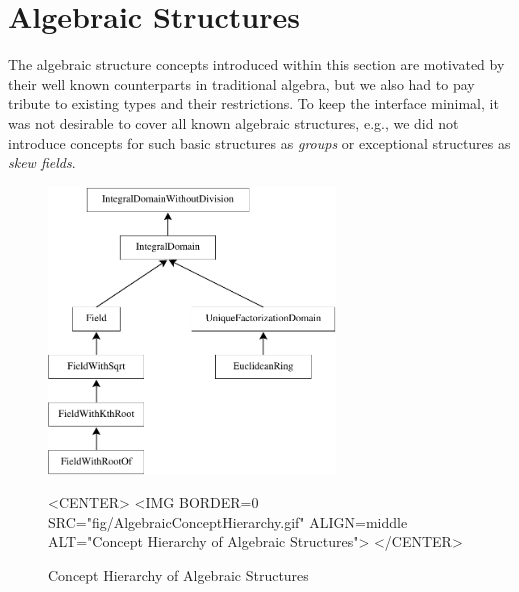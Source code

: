 
\section{Algebraic Structures}


The algebraic structure concepts introduced within this section are 
motivated by their well known counterparts in traditional algebra, 
but we also had to pay tribute to existing types and their restrictions. 
To keep the interface minimal,
it was not desirable to cover all known algebraic structures, 
e.g., we did not introduce concepts for such basic structures as {\em groups} or
exceptional structures as {\em skew fields}. 

\begin{figure}[htbp]
\begin{ccTexOnly}
\begin{center}
\includegraphics[width=3in]{Algebraic_foundations/fig/AlgebraicConceptHierarchy}
\end{center}
\end{ccTexOnly}
\begin{ccHtmlOnly}
<CENTER>
<IMG BORDER=0 SRC="fig/AlgebraicConceptHierarchy.gif" 
 ALIGN=middle ALT="Concept Hierarchy of Algebraic Structures">
</CENTER>
\end{ccHtmlOnly}
\caption{Concept Hierarchy of Algebraic Structures
\label{fig::ConceptHierarchyOfAlgebraicStructures}}
\end{figure}

